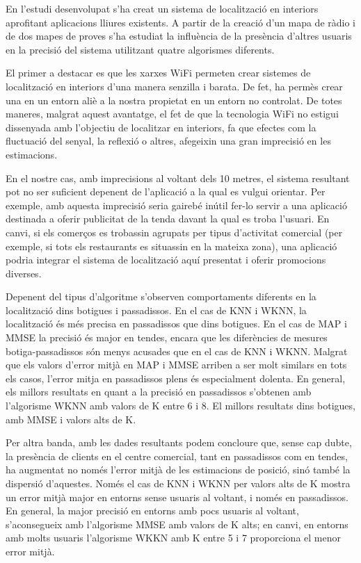 
En l'estudi desenvolupat s'ha creat un sistema de localització en interiors aprofitant aplicacions lliures existents. A partir de la creació d'un mapa de ràdio i de dos mapes de proves s'ha estudiat la influència de la presència d'altres usuaris en la precisió del sistema utilitzant quatre algorismes diferents.

El primer a destacar es que les xarxes WiFi permeten crear sistemes de localització en interiors d'una manera senzilla i barata. De fet, ha permès crear una en un entorn aliè a la nostra propietat en un entorn no controlat. De totes maneres, malgrat aquest avantatge, el fet de que la tecnologia WiFi no estigui dissenyada amb l'objectiu de localitzar en interiors, fa  que efectes com la fluctuació del senyal, la reflexió o altres, afegeixin una gran imprecisió en les estimacions.

En el nostre cas, amb imprecisions al voltant dels 10 metres, el sistema resultant pot no ser suficient depenent de l'aplicació a la qual es vulgui orientar. Per exemple, amb aquesta imprecisió seria gairebé inútil fer-lo servir a una aplicació destinada a oferir publicitat de la tenda davant la qual es troba l'usuari. En canvi, si els comerços es trobassin agrupats per tipus d'activitat comercial (per exemple, si tots els restaurants es situassin en la mateixa zona), una aplicació podria integrar el sistema de localització aquí presentat i oferir promocions diverses.

Depenent del tipus d'algoritme s'observen comportaments diferents en la localització dins botigues i passadissos. En el cas de KNN i WKNN, la localització és més precisa en passadissos que dins botigues. En el cas de MAP i MMSE la precisió és major en tendes, encara que les diferències de mesures botiga-passadissos són menys acusades que en el cas de KNN i WKNN. Malgrat que els valors d'error mitjà en MAP i MMSE arriben a ser molt similars en tots els casos, l'error mitja en passadissos plens és especialment dolenta. En general, els millors resultats en quant a la precisió en passadissos s'obtenen amb l'algorisme WKNN amb valors de K entre 6 i 8. El millors resultats dins botigues, amb MMSE i valors alts de K.

Per altra banda, amb les dades resultants podem concloure que, sense cap dubte, la presència de clients en el centre comercial, tant en passadissos com en tendes, ha augmentat no només l'error mitjà de les estimacions de posició, sinó també la dispersió d'aquestes. Només el cas de KNN i WKNN per valors alts de K mostra un error mitjà major en entorns sense usuaris al voltant, i només en passadissos. En general, la major precisió en entorns amb pocs usuaris al voltant, s'aconsegueix amb l'algorisme MMSE amb valors de K alts; en canvi, en entorns amb molts usuaris l'algorisme WKKN amb K entre 5 i 7 proporciona el menor error mitjà.
